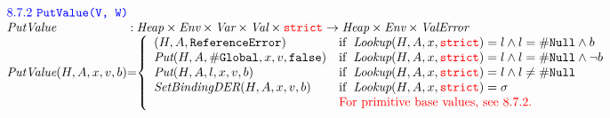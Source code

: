\documentclass[a4paper, leqno]{amsart}
\def\inred{\color{red}}
\def\inblue{\color{blue}}
\newcommand{\strict}{{\inred\tt strict}}
\newcommand{\nullL}{{\tt \#Null}}
\newcommand{\false}{{\tt false}}
\newcommand{\er}{\ensuremath{\sigma}}
\newcommand{\ve}{\emph{ValError}}
\newcommand{\re}{{\tt ReferenceError}}
\newcommand{\Val}{\emph{Val}}
\newcommand{\Heap}{\emph{Heap}}
\newcommand{\Var}{\emph{Var}}
\newcommand{\Env}{\emph{Env}}
\renewcommand{\lg}{{\tt \#Global}}
\newcommand{\hf}[1]{\emph{#1}}
\newcommand{\ifc}[1]{{\rm if}\begin{array}[t]{l}#1\end{array}}
\def\inred{\color{red}}
\def\inblue{\color{blue}}
\begin{document}
\[\begin{array}{l@{}c@{}l}

\multicolumn{3}{l}{\mbox{\inblue 8.7.2 {\tt PutValue(V, W)}}}\\
\hf{PutValue} & :& \Heap \times \Env \times \Var \times \Val \times \strict
\rightarrow \Heap \times \Env \times \ve\\
\hf{PutValue}(H,A,x,v,b) &=&
\left\{\begin{array}{ll}
(H,A,\re)
&\ifc{\hf{Lookup}(H,A,x,\strict) = l \wedge l = \nullL \wedge b}\\
\hf{Put}(H,A,\lg,x,v,\false)
&\ifc{\hf{Lookup}(H,A,x,\strict) = l \wedge l = \nullL \wedge \neg b}\\

\hf{Put}(H,A,l,x,v,b)
&\ifc{\hf{Lookup}(H,A,x,\strict) = l  \wedge l \not= \nullL }\\ %
\hf{SetBindingDER}(H,A,x,v,b)
&\ifc{\hf{Lookup}(H,A,x,\strict) = \er}\\
& \mbox{\inred For primitive base values, see 8.7.2.}\\
\end{array}\right.
\\\\



\end{array}\]
\end{document}
